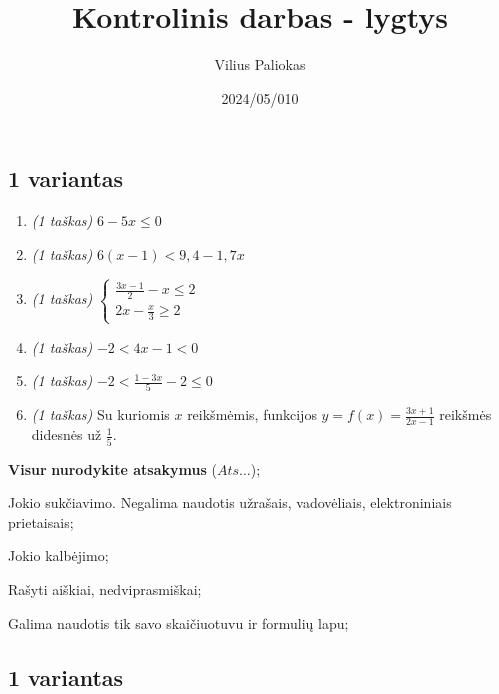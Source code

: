 \documentclass[a4paper]{article}
\title{Kontrolinis darbas - lygtys}
\author{Vilius Paliokas}
\date{2024/05/010}
\begin{document}
\thispagestyle{fancy}

\titlespacing*{\subsection}{0pt}{.75ex}{0.75ex}

\subsection*{1 variantas}

\begin{enumerate}
      \item \textit{(1 taškas)} $6-5x \leqslant 0$
      \item \textit{(1 taškas)} $6(x-1) < 9,4 - 1,7x$
      \item \textit{(1 taškas)}
      \(
      \left\{\begin{matrix}
            \frac{3x-1}{2}-x \leqslant 2 \\
            2x - \frac{x}{3} \geqslant 2
      \end{matrix}\right.
      \)
      \item \textit{(1 taškas)} $-2<4x-1<0$
      \item \textit{(1 taškas)} $-2 < \frac{1-3x}{5}-2 \leqslant 0$
      \item \textit{(1 taškas)} Su kuriomis $x$ reikšmėmis, funkcijos $y=f(x)=\frac{3x+1}{2x-1}$ reikšmės didesnės už $\frac{1}{5}$.
\end{enumerate}

\begin{small}
      \begin{enumerate*}[label={(\arabic*)}]
            \item \textbf{Visur} \textbf{nurodykite atsakymus} ($Ats\ldots$);
            \item Jokio sukčiavimo. Negalima naudotis užrašais, vadovėliais,
            elektroniniais prietaisais;
            \item Jokio kalbėjimo;
            \item Rašyti aiškiai, nedviprasmiškai;
            \item Galima naudotis tik savo skaičiuotuvu ir formulių lapu;
      \end{enumerate*}
\end{small}

\vspace*{3mm}

\subsection*{1 variantas}
\end{document}

